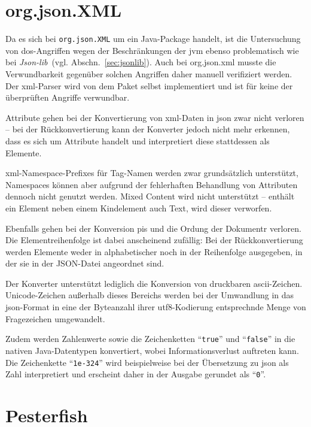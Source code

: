 \section{org.json.XML}
\label{sec:orgjsonxml}

Da es sich bei \texttt{org.json.XML} um ein Java-Package handelt, ist die Untersuchung von \acrshort{dos}-Angriffen wegen der Beschränkungen der \acrlong{jvm} ebenso problematisch wie bei \emph{Json-lib}~(vgl. Abschn.~\ref{sec:jsonlib}). Auch bei org.json.\acrshort{xml} musste die Verwundbarkeit gegenüber solchen Angriffen daher manuell verifiziert werden. Der \acrshort{xml}-Parser wird von dem Paket selbst implementiert und ist für keine der überprüften Angriffe verwundbar.

Attribute gehen bei der Konvertierung von \acrshort{xml}-Daten in \acrshort{json} zwar nicht verloren -- bei der Rückkonvertierung kann der Konverter jedoch nicht mehr erkennen, dass es sich um Attribute handelt und interpretiert diese stattdessen als Elemente.

\acrshort{xml}-Namespace-Prefixes für Tag-Namen werden zwar grundsätzlich unterstützt, Namespaces können aber aufgrund der fehlerhaften Behandlung von Attributen dennoch nicht genutzt werden.
 Mixed Content wird nicht unterstützt -- enthält ein Element neben einem Kindelement auch Text, wird dieser verworfen.

Ebenfalls gehen bei der Konversion \glspl{pi} und die Ordung der Dokumentr verloren. Die Elementreihenfolge ist dabei anscheinend zufällig: Bei der Rückkonvertierung werden Elemente weder in alphabetischer noch in der Reihenfolge ausgegeben, in der sie in der JSON-Datei angeordnet sind.

Der Konverter unterstützt lediglich die Konversion von druckbaren \acrshort{ascii}-Zeichen. Unicode-Zeichen außerhalb dieses Bereichs werden bei der Umwandlung in das \acrshort{json}-Format in eine der Byteanzahl ihrer \acrshort{utf8}-Kodierung entsprechnde Menge von Fragezeichen umgewandelt.

Zudem werden Zahlenwerte sowie die Zeichenketten \enquote{\texttt{true}} und \enquote{\texttt{false}} in die nativen Java-Datentypen konvertiert, wobei Informationsverlust auftreten kann. Die Zeichenkette \enquote{\texttt{1e-324}} wird beispielweise bei der Übersetzung zu \acrshort{json} als Zahl interpretiert und erscheint daher in der Ausgabe gerundet als \enquote{\texttt{0}}.

\section{Pesterfish}
\label{sec:pesterfish}

